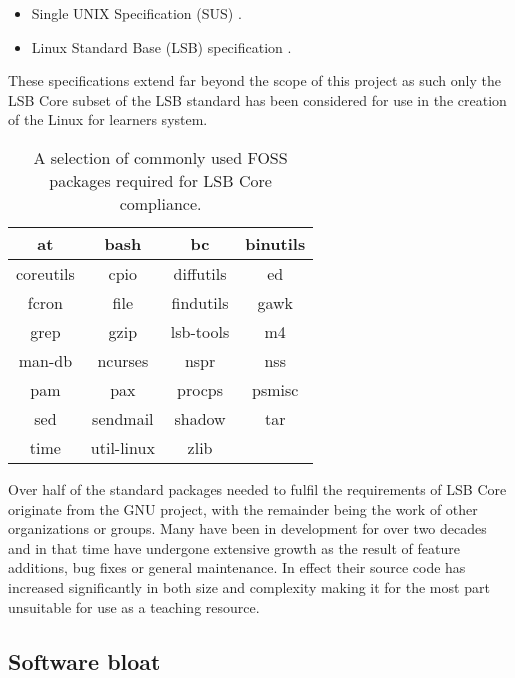 \begin{itemize}
    \item Single UNIX Specification (SUS) \cite{susv4}.
    \item Linux Standard Base (LSB) specification \cite{lsb}.
\end{itemize}

These specifications extend far beyond the scope of this project as such only the LSB Core subset of the LSB standard has been considered for use in the creation of the Linux for learners system.

\begin{table}[H]
    \centering
        \begin{tabular}{|c|c|c|c|}
            \hline
            at & bash & bc & binutils \\
            \hline
            coreutils & cpio & diffutils & ed \\
            \hline
            fcron & file & findutils & gawk \\
            \hline
            grep & gzip & lsb-tools & m4 \\
            \hline
            man-db & ncurses & nspr & nss \\
            \hline
            pam & pax & procps & psmisc \\
            \hline
            sed & sendmail & shadow & tar \\
            \hline
            time & util-linux & zlib \\
            \cline{1-3}
        \end{tabular}
        \caption{A selection of commonly used FOSS packages required for LSB Core compliance.}
\end{table}

Over half of the standard packages needed to fulfil the requirements of LSB Core originate from the GNU project, with the remainder being the work of other organizations or groups. Many have been in development for over two decades and in that time have undergone extensive growth as the result of feature additions, bug fixes or general maintenance. In effect their source code has increased significantly in both size and complexity making it for the most part unsuitable for use as a teaching resource.

\subsection{Software bloat}

